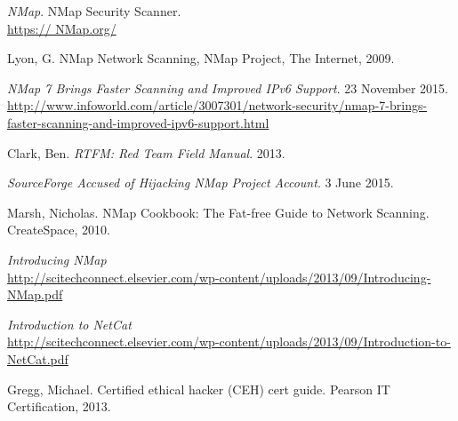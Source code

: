 \documentclass[12pt]{article}
\begin{document}
\pagebreak



\begin{thebibliography}{9}

   \textit{NMap}. NMap Security Scanner. \\
   \url{https:// NMap.org/}


Lyon, G.  NMap Network Scanning,
 NMap Project, The Internet, 2009.

\textit{ NMap 7 Brings Faster Scanning and Improved IPv6 Support}. 23 November 2015.\\
\url{http://www.infoworld.com/article/3007301/network-security/nmap-7-brings-faster-scanning-and-improved-ipv6-support.html}

Clark, Ben. \textit{RTFM: Red Team Field Manual}. 2013.

\textit{SourceForge Accused of Hijacking  NMap Project Account}. 3 June 2015.\\


Marsh, Nicholas.  NMap Cookbook: The Fat-free Guide to Network Scanning. CreateSpace, 2010.
    
\textit{Introducing  NMap}\\
\url{http://scitechconnect.elsevier.com/wp-content/uploads/2013/09/Introducing- NMap.pdf}

\textit{Introduction to NetCat}\\
\url{http://scitechconnect.elsevier.com/wp-content/uploads/2013/09/Introduction-to-NetCat.pdf}


Gregg, Michael. Certified ethical hacker (CEH) cert guide. Pearson IT Certification, 2013.

\end{thebibliography}
\end{document}
